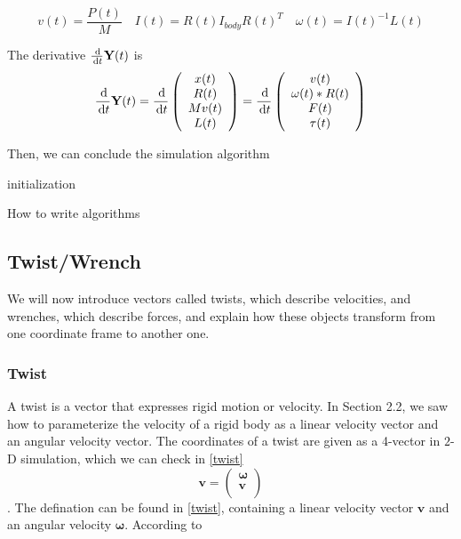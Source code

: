 \begin{equation}
    v(t) = \frac{P(t)}{M} \quad
    {I(t)} = R(t)I_{body}R(t)^{T} \quad
    \omega(t) = I(t)^{-1}L(t)
\end{equation}

The derivative $\frac{\,\mathrm{d}}{\,\mathrm{d} t}\textbf{Y}(t)$ is
\begin{equation}
    \frac{\,\mathrm{d}}{\,\mathrm{d}{t}}\textbf{Y}(t) = \frac{\,\mathrm{d}}{\,\mathrm{d} t}\left(
        \begin{array}{c}
            x(t) \\
            R(t) \\
            M v(t) \\
            L(t) \\
        \end{array}
    \right) = \frac{\,\mathrm{d}}{\,\mathrm{d} t}\left(
        \begin{array}{c}
            v(t) \\
            \omega(t)*R(t) \\
            F(t) \\
            \tau(t) \\
        \end{array}
    \right)
\end{equation}

Then, we can conclude the simulation algorithm

\begin{algorithm}[H]
 initialization\;
 \caption{How to write algorithms}
\end{algorithm}

\subsection{Twist/Wrench}
We will now introduce vectors called twists, which describe velocities, and wrenches, which describe forces, and explain how these objects transform from one coordinate frame to another one. 
    \subsubsection{Twist} 
        A twist is a vector that expresses rigid motion or velocity. In Section 2.2, we saw how to parameterize the velocity of a rigid body as a linear velocity vector and an angular velocity vector. The coordinates of a twist are given as a 4-vector in $2$-D simulation, which we can check in \ref{twist}
            \begin{equation}
                \mathbf{v} = \left( \begin{array}{c} \pmb{\omega} \\ \pmb{v} \\ \end{array} \right )
                \label{twist}
            \end{equation}.
        The defination can be found in \ref{twist}, containing a linear velocity vector \(\pmb{v}\) and an angular velocity \(\pmb{\omega}\). According to 


